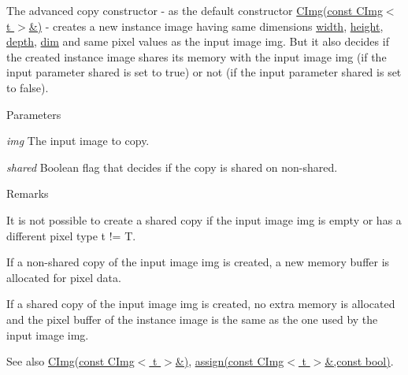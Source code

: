 The advanced copy constructor -\/ as the default constructor \hyperlink{structcimg__library_1_1_c_img_a66c7fa3d12a095a5c5ade44f8c7f525a}{CImg(const CImg$<$ t $>$\&)} -\/ creates a new instance image having same dimensions \hyperlink{structcimg__library_1_1_c_img_a5fb74a7776210bb99fd6755319ade13f}{width}, \hyperlink{structcimg__library_1_1_c_img_a30d575fd18ae525e507315de71b4806a}{height}, \hyperlink{structcimg__library_1_1_c_img_a982d5d1e153477adf7f851106fe8ee3a}{depth}, \hyperlink{structcimg__library_1_1_c_img_ac9648dfe0a26d58e6e0030a3dbca234e}{dim} and same pixel values as the input image {\ttfamily img}. But it also decides if the created instance image shares its memory with the input image {\ttfamily img} (if the input parameter {\ttfamily shared} is set to {\ttfamily true}) or not (if the input parameter {\ttfamily shared} is set to {\ttfamily false}). 
\begin{DoxyParams}{Parameters}
\item[{\em img}]The input image to copy. \item[{\em shared}]Boolean flag that decides if the copy is shared on non-\/shared. \end{DoxyParams}
\begin{DoxyRemark}{Remarks}

\begin{DoxyItemize}
\item It is not possible to create a shared copy if the input image {\ttfamily img} is empty or has a different pixel type {\ttfamily t} != {\ttfamily T}.
\item If a non-\/shared copy of the input image {\ttfamily img} is created, a new memory buffer is allocated for pixel data.
\item If a shared copy of the input image {\ttfamily img} is created, no extra memory is allocated and the pixel buffer of the instance image is the same as the one used by the input image {\ttfamily img}. 
\end{DoxyItemize}
\end{DoxyRemark}
\begin{DoxySeeAlso}{See also}
\hyperlink{structcimg__library_1_1_c_img_a66c7fa3d12a095a5c5ade44f8c7f525a}{CImg(const CImg$<$ t $>$\&)}, \hyperlink{structcimg__library_1_1_c_img_a8ef44313e56a0df4cde616f289422eae}{assign(const CImg$<$ t $>$\&,const bool)}. 
\end{DoxySeeAlso}
